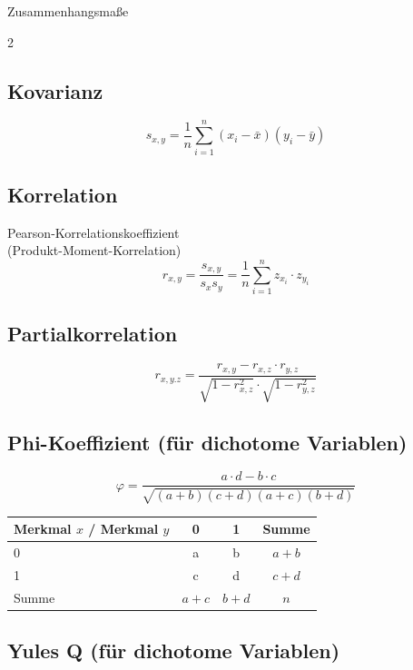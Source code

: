 \begin{formulaBox}{Zusammenhangsmaße}{}


\begin{multicols}{2}
\subsection*{Kovarianz}
$$s_{x, y}=\frac{1}{n}\sum\limits_{i=1}^{n}(x_i-\bar{x})(y_i-\bar{y})$$

\subsection*{Korrelation}
Pearson-Korrelationskoeffizient \\
(Produkt-Moment-Korrelation)
$$r_{x, y}=\frac{s_{x, y}}{s_xs_y}= \frac{1}{n}\sum\limits_{i=1}^{n}{z_{x_i}\cdot z_{y_i}}$$

\subsection*{Partialkorrelation}
$$r_{x, y.z}=\frac{r_{x, y}- r_{x, z}\cdot r_{y, z}}{\sqrt{1-r_{x, z}^{2}}\cdot\sqrt{1-r_{y, z}^{2}}}$$

\subsection*{Phi-Koeffizient (für dichotome Variablen)}
$$\varphi=\frac{a\cdot d-b\cdot c}{\sqrt{(a+b)(c+d)(a+c)(b+d)}}$$

\begin{center}
\begin{tabular}{@{} l c c c @{}}
\toprule
Merkmal $x$ / Merkmal $y$ & 0 & 1 & Summe \\
\midrule
0     & a & b & $a+b$ \\
1     & c & d & $c+d$ \\
\midrule
Summe & $a+c$ & $b+d$ & $n$ \\
\bottomrule
\end{tabular}
\end{center}

\subsection*{Yules Q (für dichotome Variablen)}


\end{multicols}
\end{formulaBox}

